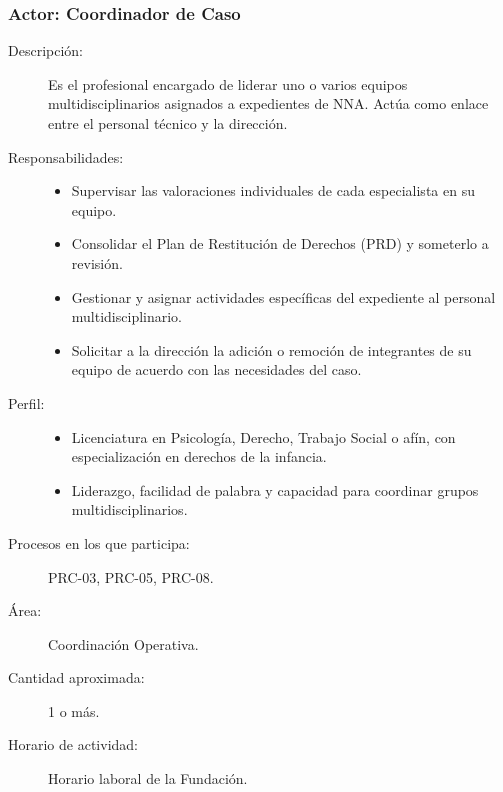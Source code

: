 \subsubsection{Actor: Coordinador de Caso}
\begin{description}
	\item[Descripción:] Es el profesional encargado de liderar uno o varios equipos multidisciplinarios asignados a expedientes de NNA. Actúa como enlace entre el personal técnico y la dirección.
	\item[Responsabilidades:] \cdtEmpty
		\begin{itemize}
			\item Supervisar las valoraciones individuales de cada especialista en su equipo.
			\item Consolidar el Plan de Restitución de Derechos (PRD) y someterlo a revisión.
			\item Gestionar y asignar actividades específicas del expediente al personal multidisciplinario.
			\item Solicitar a la dirección la adición o remoción de integrantes de su equipo de acuerdo con las necesidades del caso.
		\end{itemize}
	\item[Perfil:] \cdtEmpty
		\begin{itemize}
			\item Licenciatura en Psicología, Derecho, Trabajo Social o afín, con especialización en derechos de la infancia.
			\item Liderazgo, facilidad de palabra y capacidad para coordinar grupos multidisciplinarios.
		\end{itemize}
	\item[Procesos en los que participa:] PRC-03, PRC-05, PRC-08.
	\item[Área:] Coordinación Operativa.
	\item[Cantidad aproximada:] 1 o más.
	\item[Horario de actividad:] Horario laboral de la Fundación.
\end{description}


